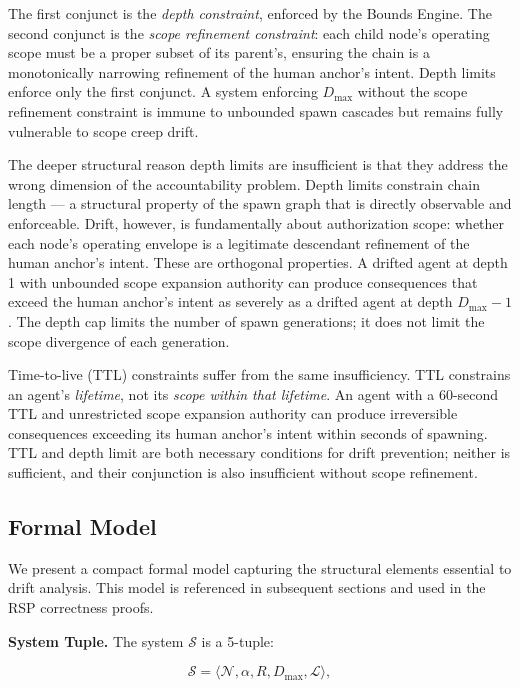 The first conjunct is the \emph{depth constraint}, enforced by the Bounds Engine. The second conjunct is the \emph{scope refinement constraint}: each child node's operating scope must be a proper subset of its parent's, ensuring the chain is a monotonically narrowing refinement of the human anchor's intent. Depth limits enforce only the first conjunct. A system enforcing $D_{\max}$ without the scope refinement constraint is immune to unbounded spawn cascades but remains fully vulnerable to scope creep drift.

The deeper structural reason depth limits are insufficient is that they address the wrong dimension of the accountability problem. Depth limits constrain chain length — a structural property of the spawn graph that is directly observable and enforceable. Drift, however, is fundamentally about authorization scope: whether each node's operating envelope is a legitimate descendant refinement of the human anchor's intent. These are orthogonal properties. A drifted agent at depth 1 with unbounded scope expansion authority can produce consequences that exceed the human anchor's intent as severely as a drifted agent at depth $D_{\max} - 1$. The depth cap limits the number of spawn generations; it does not limit the scope divergence of each generation.

Time-to-live (TTL) constraints suffer from the same insufficiency. TTL constrains an agent's \emph{lifetime}, not its \emph{scope within that lifetime}. An agent with a 60-second TTL and unrestricted scope expansion authority can produce irreversible consequences exceeding its human anchor's intent within seconds of spawning. TTL and depth limit are both necessary conditions for drift prevention; neither is sufficient, and their conjunction is also insufficient without scope refinement.

\subsection{Formal Model}
\label{sec:rs-drift-model}

We present a compact formal model capturing the structural elements essential to drift analysis. This model is referenced in subsequent sections and used in the RSP correctness proofs.

\medskip
\noindent\textbf{System Tuple.}
The system $\mathcal{S}$ is a 5-tuple:

\begin{equation}
\mathcal{S} = \langle \mathcal{N}, \alpha, R, D_{\max}, \mathcal{L} \rangle,
\label{eq:rs-system-model}
\end{equation}

